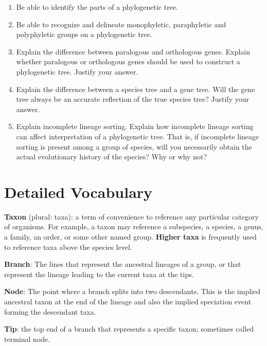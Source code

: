\documentclass[letterpaper]{tufte-handout}
\begin{document}
\begin{enumerate}
	
	\item Be able to identify the parts of a phylogenetic tree.
	
	\item Be able to recognize and delineate monophyletic, paraphyletic and polyphyletic groups on a phylogenetic tree.

	\item Explain the difference between paralogous and orthologous genes. Explain whether paralogous or orthologous genes should be used to construct a phylogenetic tree. Justify your answer.
	
	\item Explain the difference between a species tree and a gene tree. Will the gene tree always be an accurate reflection of the true species tree? Justify your answer.
	
	\item Explain incomplete lineage sorting. Explain how incomplete lineage sorting can affect interpretation of a phylogenetic tree. That is, if incomplete lineage sorting is present among a group of species, will you necessarily obtain the actual evolutionary history of the species? Why or why not?
	
	

\end{enumerate}

\section{Detailed Vocabulary}

\textbf{Taxon} (plural: taxa): a term of convenience to reference any particular category of organisms. For example, a taxon may reference a subspecies, a species, a genus, a family, an order, or some other named group. \textbf{Higher taxa} is frequently used to reference taxa above the species level.

\textbf{Branch}: The lines that represent the ancestral lineages of a group, or that represent the lineage leading to the current taxa at the tips.

\textbf{Node}: The point where a branch splits into two descendants.  This is the implied ancestral taxon at the end of the lineage and also the implied speciation event forming the descendant taxa.

\textbf{Tip}: the top end of a branch that represents a specific taxon; sometimes called terminal node.
\end{document}
